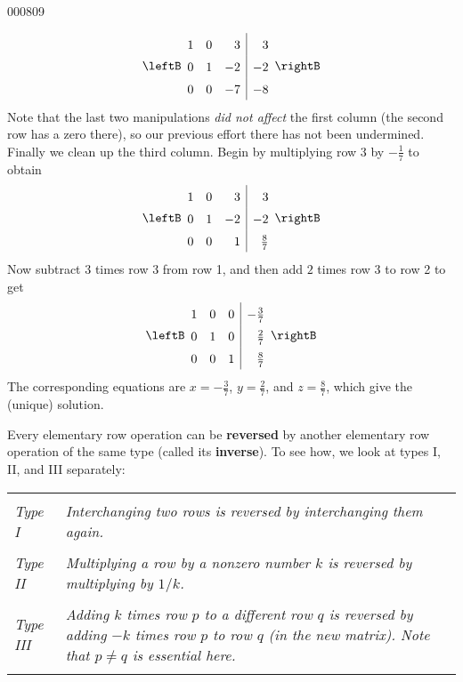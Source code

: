 \begin{example}{}{000809}
\begin{solution}
\begin{equation*}
\leftB \begin{array}{rrr|r}
1 & 0 & 3 & 3 \\
0 & 1 & -2 & -2 \\
0 & 0 & -7 & -8
\end{array} \rightB
\end{equation*}
Note that the last two manipulations \textit{did not affect} the first column (the second row has a zero there), so our previous effort there has not been undermined. Finally we clean up the third 
column. Begin by multiplying row 3 by $-\frac{1}{7} $ to obtain
\begin{equation*}
\leftB \begin{array}{rrr|r}
1 & 0 & 3 & 3 \\
0 & 1 & -2 &  -2 \\
0 & 0 & 1 & \frac{8}{7}
\end{array} \rightB
\end{equation*}
Now subtract $3$ times row 3 from row 1, and then add $2$ times row 3 to row 2 to get
\begin{equation*}
\def\arraystretch{1.5}
\leftB \begin{array}{rrr|r}
1 & 0 & 0 & - \frac{3}{7} \\
0 & 1 & 0 &  \frac{2}{7} \\
0 & 0 & 1 & \frac{8}{7}
\end{array} \rightB
\end{equation*}
The corresponding equations are $x = -\frac{3}{7}$, $y = \frac{2}{7}$, and $z = \frac{8}{7}$, which give the (unique) solution.
\end{solution}
\end{example}

Every elementary row operation can be \textbf{reversed} by another elementary row operation of the same type (called its \textbf{inverse}). To see how, we look at types I, II, and III separately:

\begin{tabu}{lX[5]}\label{itm:types}
& \\
\textit{Type I} & \textit{Interchanging two rows is reversed by interchanging them again.} \\
&\\
\textit{Type II} & \textit{Multiplying a row by a nonzero number $k$ is reversed by multiplying by $1/k$.} \\
&\\
\textit{Type III} & \textit{Adding $k$ times row $p$ to a different row $q$ is reversed by adding $-k$ times row $p$ to row $q$ (in the new matrix). Note that $p \neq q$ is essential here.}\\
&\\
\end{tabu}


